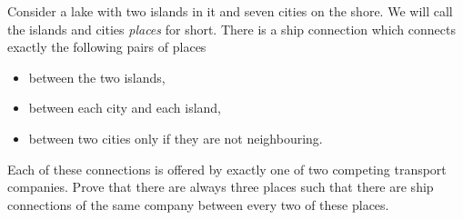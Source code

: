 Consider a lake with two islands in it and seven cities on the shore.
We will call the islands and cities \emph{places} for short.
There is a ship connection which connects exactly the following pairs of places
\begin{itemize}
    \item between the two islands,
    \item between each city and each island,
    \item between two cities only if they are not neighbouring.
\end{itemize}
Each of these connections is offered by exactly one of two competing transport companies.
Prove that there are always three places such that there are ship connections
of the same company between every two of these places.
